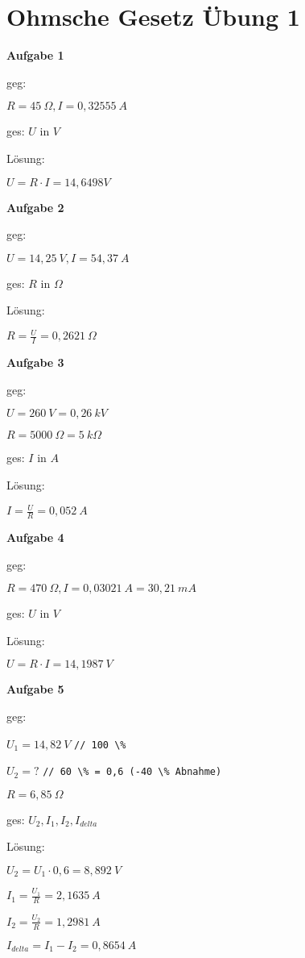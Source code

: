 \section{Ohmsche Gesetz Übung 1}\label{ohmsche-gesetz-uebung-1}

\textbf{Aufgabe 1}

geg:

$R = 45~\Omega, I = 0,32555~A$

ges: $U \text{ in } V$

Lösung:

$U = R \cdot I = 14,6498 V$

\textbf{Aufgabe 2}

geg:

$U = 14,25~V, I = 54,37~A$

ges: $R \text{ in } \Omega$

Lösung:

$R = \frac{U}{I} = 0,2621~\Omega$

\textbf{Aufgabe 3}

geg:

$U = 260~V = 0,26~kV$

$R = 5000~\Omega = 5~k\Omega$

ges: $I \text{ in } A$

Lösung:

$I = \frac{U}{R} = 0,052~A$

\newpage

\textbf{Aufgabe 4}

geg:

$R = 470~\Omega, I = 0,03021~A = 30,21~mA$

ges: $U \text{ in } V$

Lösung:

$U = R \cdot I = 14,1987~V$

\textbf{Aufgabe 5}

geg:

$U_1 = 14,82~V$ \verb|// 100 \%|

$U_2 = \text{?}$
\verb|// 60 \% = 0,6 (-40 \% Abnahme)|

$R = 6,85~\Omega$

ges: $U_2, I_1, I_2, I_{delta}$

Lösung:

$U_2 = U_1 \cdot 0,6 = 8,892~V$

$I_1 = \frac{U_1}{R} = 2,1635~A$

$I_2 = \frac{U_2}{R} = 1,2981~A$

$I_{delta} = I_1 - I_2 = 0,8654~A$

